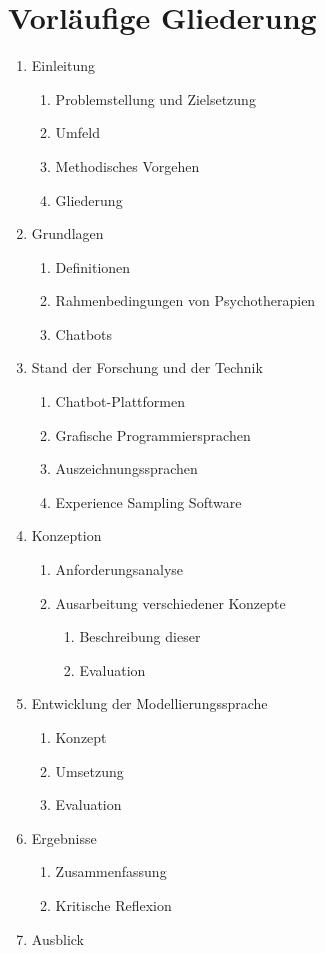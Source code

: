
\section{Vorläufige Gliederung}
\label{ch:Gliederung}
\begin{enumerate} 
\item Einleitung
	\begin{enumerate}
	\item Problemstellung und Zielsetzung
	\item Umfeld
	\item Methodisches Vorgehen
	\item Gliederung
	\end{enumerate}
\item Grundlagen
	\begin{enumerate}
	\item Definitionen
	\item Rahmenbedingungen von Psychotherapien
	\item Chatbots
	\end{enumerate}
\item Stand der Forschung und der Technik
	\begin{enumerate}
	\item Chatbot-Plattformen
	\item Grafische Programmiersprachen
	\item Auszeichnungssprachen
	\item Experience Sampling Software
	\end{enumerate}
\item Konzeption
	\begin{enumerate}
	\item Anforderungsanalyse
	\item Ausarbeitung verschiedener Konzepte
		\begin{enumerate}
		\item Beschreibung dieser
		\item Evaluation
		\end{enumerate}
	\end{enumerate}
\item Entwicklung der Modellierungssprache
	\begin{enumerate}
	\item Konzept
	\item Umsetzung
	\item Evaluation
	\end{enumerate}

\item Ergebnisse
	\begin{enumerate}
	\item Zusammenfassung
	\item Kritische Reflexion
	\end{enumerate}
\item Ausblick
\end{enumerate}

	